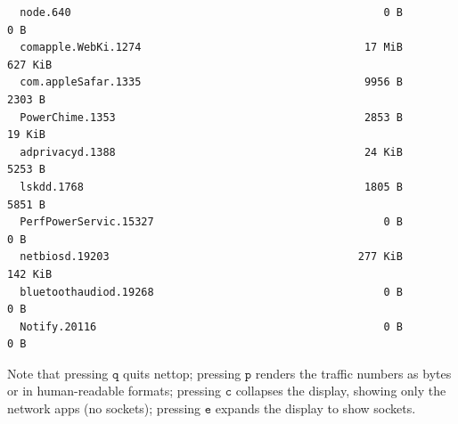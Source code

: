 \documentclass{article}
\begin{document}
\begin{lstlisting}
  node.640                                                 0 B           0 B
  comapple.WebKi.1274                                   17 MiB       627 KiB
  com.appleSafar.1335                                   9956 B        2303 B
  PowerChime.1353                                       2853 B        19 KiB
  adprivacyd.1388                                       24 KiB        5253 B
  lskdd.1768                                            1805 B        5851 B
  PerfPowerServic.15327                                    0 B           0 B
  netbiosd.19203                                       277 KiB       142 KiB
  bluetoothaudiod.19268                                    0 B           0 B
  Notify.20116                                             0 B           0 B
  \end{lstlisting}
  Note that pressing $\texttt{q}$ quits nettop; pressing $\texttt{p}$ renders the traffic numbers as bytes or in human-readable formats; pressing $\texttt{c}$ collapses the display, showing only the network apps (no sockets); pressing $\texttt{e}$ expands the display to show sockets. 
\end{document}
